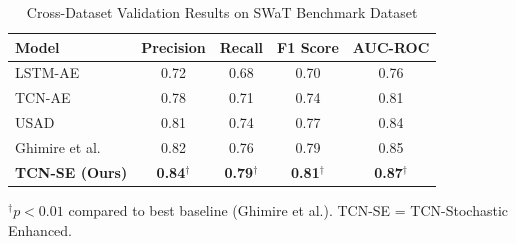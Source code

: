 \begin{table}[htbp]
\centering
\caption{Cross-Dataset Validation Results on SWaT Benchmark Dataset}
\label{table:swat_results}
\begin{tabular}{lcccc}
\toprule
\textbf{Model} & \textbf{Precision} & \textbf{Recall} & \textbf{F1 Score} & \textbf{AUC-ROC} \\
\midrule
LSTM-AE & 0.72 & 0.68 & 0.70 & 0.76 \\
TCN-AE & 0.78 & 0.71 & 0.74 & 0.81 \\
USAD & 0.81 & 0.74 & 0.77 & 0.84 \\
Ghimire et al. \cite{ghimire_electricity_2025} & 0.82 & 0.76 & 0.79 & 0.85 \\
\textbf{TCN-SE (Ours)} & \textbf{0.84}$^\dagger$ & \textbf{0.79}$^\dagger$ & \textbf{0.81}$^\dagger$ & \textbf{0.87}$^\dagger$ \\
\bottomrule
\end{tabular}
\begin{flushleft}
\footnotesize $^\dagger p < 0.01$ compared to best baseline (Ghimire et al.). TCN-SE = TCN-Stochastic Enhanced.
\end{flushleft}
\end{table}